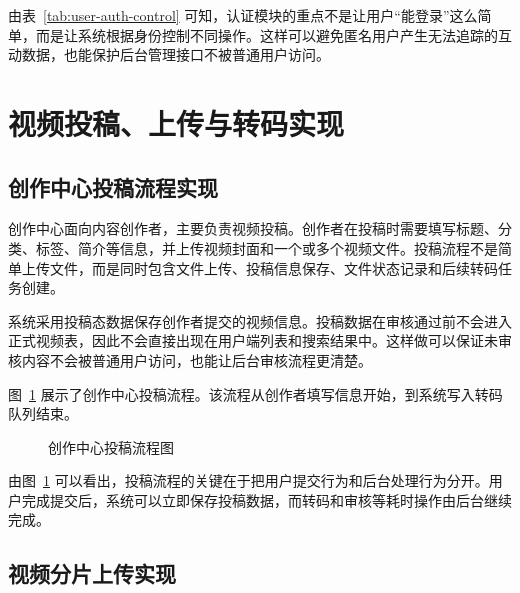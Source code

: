 由表~\ref{tab:user-auth-control} 可知，认证模块的重点不是让用户“能登录”这么简单，而是让系统根据身份控制不同操作。这样可以避免匿名用户产生无法追踪的互动数据，也能保护后台管理接口不被普通用户访问。

\section{视频投稿、上传与转码实现}
\label{sec:upload-transcode-implementation}

\subsection{创作中心投稿流程实现}
\label{subsec:creator-post-implementation}

创作中心面向内容创作者，主要负责视频投稿。创作者在投稿时需要填写标题、分类、标签、简介等信息，并上传视频封面和一个或多个视频文件。投稿流程不是简单上传文件，而是同时包含文件上传、投稿信息保存、文件状态记录和后续转码任务创建。

系统采用投稿态数据保存创作者提交的视频信息。投稿数据在审核通过前不会进入正式视频表，因此不会直接出现在用户端列表和搜索结果中。这样做可以保证未审核内容不会被普通用户访问，也能让后台审核流程更清楚。

图~\ref{fig:creator-post-flow} 展示了创作中心投稿流程。该流程从创作者填写信息开始，到系统写入转码队列结束。

\begin{figure}[htbp]
  \centering
  \caption{创作中心投稿流程图}
  \label{fig:creator-post-flow}
\end{figure}

由图~\ref{fig:creator-post-flow} 可以看出，投稿流程的关键在于把用户提交行为和后台处理行为分开。用户完成提交后，系统可以立即保存投稿数据，而转码和审核等耗时操作由后台继续完成。

\subsection{视频分片上传实现}
\label{subsec:chunk-upload-implementation}

